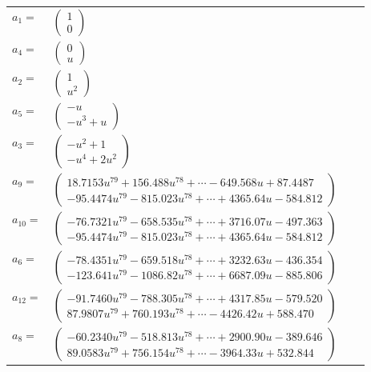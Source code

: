 \documentclass[1p]{elsarticle_modified}
\theoremstyle{definition}
\begin{document}
\begin{tabular}{m{7pt} m{180pt} m{7pt} m{180pt} }
\flushright $a_{1}=$&$\begin{pmatrix}1\\0\end{pmatrix}$ \\
\flushright $a_{4}=$&$\begin{pmatrix}0\\u\end{pmatrix}$ \\
\flushright $a_{2}=$&$\begin{pmatrix}1\\u^2\end{pmatrix}$ \\
\flushright $a_{5}=$&$\begin{pmatrix}- u\\- u^3+u\end{pmatrix}$ \\
\flushright $a_{3}=$&$\begin{pmatrix}- u^2+1\\- u^4+2 u^2\end{pmatrix}$ \\
\flushright $a_{9}=$&$\begin{pmatrix}18.7153 u^{79}+156.488 u^{78}+\cdots-649.568 u+87.4487\\-95.4474 u^{79}-815.023 u^{78}+\cdots+4365.64 u-584.812\end{pmatrix}$ \\
\flushright $a_{10}=$&$\begin{pmatrix}-76.7321 u^{79}-658.535 u^{78}+\cdots+3716.07 u-497.363\\-95.4474 u^{79}-815.023 u^{78}+\cdots+4365.64 u-584.812\end{pmatrix}$ \\
\flushright $a_{6}=$&$\begin{pmatrix}-78.4351 u^{79}-659.518 u^{78}+\cdots+3232.63 u-436.354\\-123.641 u^{79}-1086.82 u^{78}+\cdots+6687.09 u-885.806\end{pmatrix}$ \\
\flushright $a_{12}=$&$\begin{pmatrix}-91.7460 u^{79}-788.305 u^{78}+\cdots+4317.85 u-579.520\\87.9807 u^{79}+760.193 u^{78}+\cdots-4426.42 u+588.470\end{pmatrix}$ \\
\flushright $a_{8}=$&$\begin{pmatrix}-60.2340 u^{79}-518.813 u^{78}+\cdots+2900.90 u-389.646\\89.0583 u^{79}+756.154 u^{78}+\cdots-3964.33 u+532.844\end{pmatrix}$ \\

\end{tabular}
\end{document}

